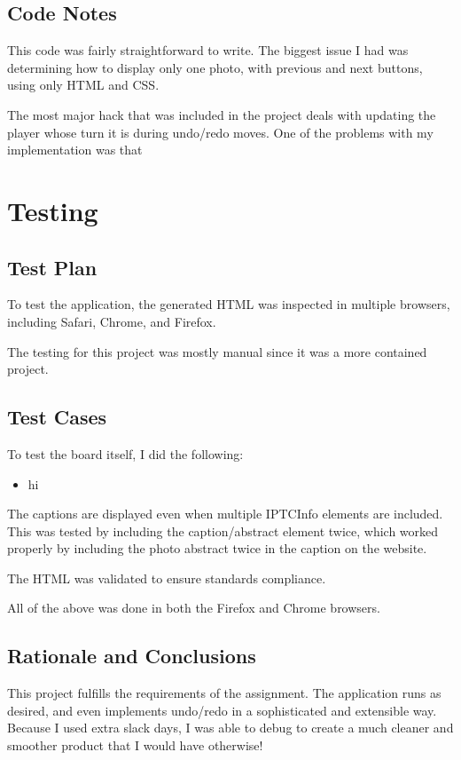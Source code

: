 \documentclass[11pt,letterpaper]{article}
\begin{document}
\subsection{Code Notes}
This code was fairly straightforward to write. The biggest issue I had was determining how to display only one photo, with previous and next buttons, using only HTML and CSS.

The most major hack that was included in the project deals with updating the player whose turn it is during undo/redo moves. One of the problems with my implementation was that 

\section{Testing}

\subsection{Test Plan}
To test the application, the generated HTML was inspected in multiple browsers, including Safari, Chrome, and Firefox.

The testing for this project was mostly manual since it was a more contained project.
\subsection{Test Cases}
To test the board itself, I did the following:
\begin{itemize}
\item hi
\end{itemize}

The captions are displayed even when multiple IPTCInfo elements are included. This was tested by including the caption/abstract element twice, which worked properly by including the photo abstract twice in the caption on the website.

The HTML was validated to ensure standards compliance.

All of the above was done in both the Firefox and Chrome browsers.

\subsection{Rationale and Conclusions}
This project fulfills the requirements of the assignment. The application runs as desired, and even implements undo/redo in a sophisticated and extensible way. Because I used extra slack days, I was able to debug to create a much cleaner and smoother product that I would have otherwise!
\end{document}
